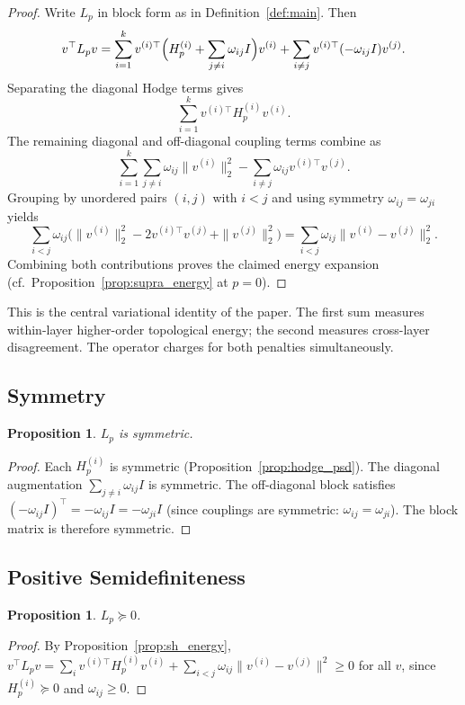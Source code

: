 \documentclass[11pt]{article}
\newtheorem{proposition}[theorem]{Proposition}
\theoremstyle{definition}
\theoremstyle{remark}
\begin{document}
\begin{proof}
Write $L_p$ in block form as in Definition~\ref{def:main}. Then
\[
  v^\top L_p v
  = \sum_{i=1}^k v^{(i)\top}\Bigl(H_p^{(i)} + \sum_{j\neq i}\omega_{ij}I\Bigr)v^{(i)}
    + \sum_{i\neq j} v^{(i)\top}(-\omega_{ij}I)v^{(j)}.
\]
Separating the diagonal Hodge terms gives
\[
  \sum_{i=1}^k v^{(i)\top}H_p^{(i)}v^{(i)}.
\]
The remaining diagonal and off-diagonal coupling terms combine as
\[
  \sum_{i=1}^k \sum_{j\neq i} \omega_{ij}\|v^{(i)}\|_2^2
  - \sum_{i\neq j}\omega_{ij}v^{(i)\top}v^{(j)}.
\]
Grouping by unordered pairs $(i,j)$ with $i<j$ and using symmetry $\omega_{ij}=\omega_{ji}$ yields
\[
  \sum_{i<j}\omega_{ij}\bigl(\|v^{(i)}\|_2^2 - 2v^{(i)\top}v^{(j)} + \|v^{(j)}\|_2^2\bigr)
  = \sum_{i<j}\omega_{ij}\|v^{(i)}-v^{(j)}\|_2^2.
\]
Combining both contributions proves the claimed energy expansion (cf.\ Proposition~\ref{prop:supra_energy} at $p=0$).
\end{proof}

This is the central variational identity of the paper. The first sum measures
within-layer higher-order topological energy; the second measures cross-layer
disagreement. The operator charges for both penalties simultaneously.

\subsection{Symmetry}

\begin{proposition}
$L_p$ is symmetric.
\end{proposition}

\begin{proof}
Each $H_p^{(i)}$ is symmetric (Proposition~\ref{prop:hodge_psd}). The diagonal
augmentation $\sum_{j\neq i}\omega_{ij}I$ is symmetric. The off-diagonal block
satisfies $(-\omega_{ij}I)^\top = -\omega_{ij}I = -\omega_{ji}I$ (since
couplings are symmetric: $\omega_{ij}=\omega_{ji}$). The block matrix is
therefore symmetric.
\end{proof}

\subsection{Positive Semidefiniteness}

\begin{proposition}
$L_p \succeq 0$.
\end{proposition}

\begin{proof}
By Proposition~\ref{prop:sh_energy},
$v^\top L_p v = \sum_i v^{(i)\top}H_p^{(i)}v^{(i)} +
\sum_{i<j}\omega_{ij}\|v^{(i)}-v^{(j)}\|^2 \geq 0$ for all $v$, since
$H_p^{(i)}\succeq 0$ and $\omega_{ij}\geq 0$.
\end{proof}
\end{document}
